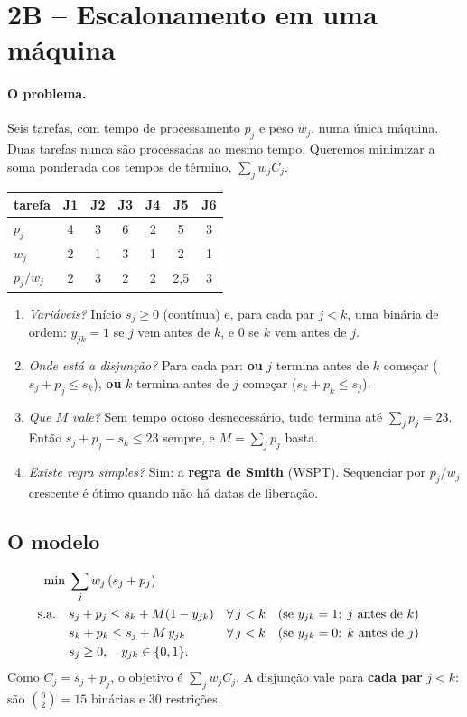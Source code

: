 \section{2B -- Escalonamento em uma máquina}

\paragraph{O problema.} Seis tarefas, com tempo de processamento $p_j$ e peso $w_j$, numa única máquina. Duas
tarefas nunca são processadas ao mesmo tempo. Queremos minimizar a soma ponderada dos tempos de término,
$\sum_j w_jC_j$.
\begin{center}
\begin{tabular}{lcccccc}
\toprule
tarefa & J1 & J2 & J3 & J4 & J5 & J6\\
\midrule
$p_j$ & 4 & 3 & 6 & 2 & 5 & 3\\
$w_j$ & 2 & 1 & 3 & 1 & 2 & 1\\
$p_j/w_j$ & 2 & 3 & 2 & 2 & 2,5 & 3\\
\bottomrule
\end{tabular}
\end{center}

\begin{discussao}
\begin{enumerate}
  \item \emph{Variáveis?} Início $s_j\ge0$ (contínua) e, para cada par $j<k$, uma binária de ordem:
  $y_{jk}=1$ se $j$ vem antes de $k$, e $0$ se $k$ vem antes de $j$.
  \item \emph{Onde está a disjunção?} Para cada par: \textbf{ou} $j$ termina antes de $k$ começar
  ($s_j+p_j\le s_k$), \textbf{ou} $k$ termina antes de $j$ começar ($s_k+p_k\le s_j$).
  \item \emph{Que $M$ vale?} Sem tempo ocioso desnecessário, tudo termina até $\sum_j p_j=23$. Então
  $s_j+p_j-s_k\le23$ sempre, e $M=\sum_jp_j$ basta.
  \item \emph{Existe regra simples?} Sim: a \textbf{regra de Smith} (WSPT). Sequenciar por $p_j/w_j$ crescente é
  ótimo quando não há datas de liberação.
\end{enumerate}
\end{discussao}

\subsection*{O modelo}
\[
\begin{aligned}
\min\;& \sum_j w_j\,(s_j+p_j)\\
\text{s.a.}\quad & s_j+p_j \le s_k + M(1-y_{jk}) &&\forall\, j<k \quad(\text{se }y_{jk}=1\text{: } j\text{ antes de }k)\\
& s_k+p_k \le s_j + M\,y_{jk} &&\forall\, j<k \quad(\text{se }y_{jk}=0\text{: } k\text{ antes de }j)\\
& s_j\ge0,\quad y_{jk}\in\{0,1\}.
\end{aligned}
\]
Como $C_j=s_j+p_j$, o objetivo é $\sum_jw_jC_j$. A disjunção vale para \textbf{cada par} $j<k$: são
$\binom{6}{2}=15$ binárias e 30 restrições.

